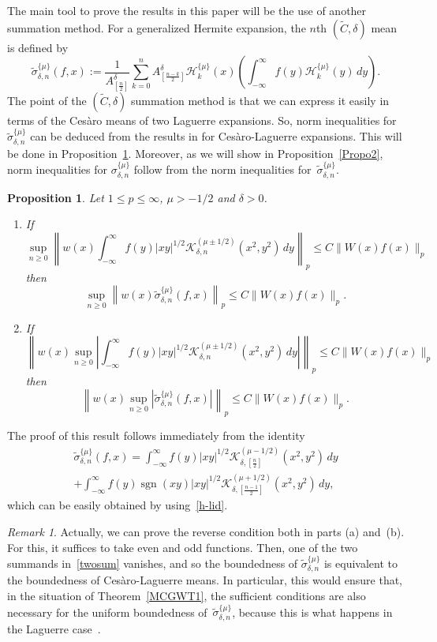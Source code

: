 \documentclass{amsart}
\theoremstyle{plain}
\newtheorem{Prop}{Proposition}
\theoremstyle{definition}
\theoremstyle{remark}
\newtheorem{Rem}{Remark}
\newcommand{\chem}[3]{\sigma_{#1,#2}^{\{#3\}}} %
\newcommand{\chemmod}[3]{\widetilde{\sigma}_{#1,#2}^{\{#3\}}} %
\newcommand{\claker}[5]{\mathcal{K}_{#1,#2}^{(#3)}%
  (#4,#5)} %
\newcommand{\herfun}[2]{\mathcal{H}_{#1}^{\{#2\}}}
\newcommand{\combi}[2]{A_{#1}^{#2}}
\newcommand{\I}{\infty}
\newcommand{\sgn}{\operatorname{sgn}}
\begin{document}
The main tool to prove the results in this paper will be the use of another summation method.
For a generalized Hermite expansion, the $n$th $(\widetilde{C},\delta)$ mean is defined by
\begin{equation}
\label{stilde}
  \chemmod{\delta}{n}{\mu}(f,x)
  := \frac{1}{\combi{[\frac{n}2]}{\delta}}
  \sum_{k=0}^n\combi{[\frac{n-k}2]}{\delta}
  \herfun{k}{\mu}(x) \left(\int_{-\I}^\I f(y)\herfun{k}{\mu}(y)\,dy\right).
\end{equation}
The point of the $(\widetilde{C},\delta)$ summation method is that we can express it easily
in terms of the Ces\`{a}ro means of two Laguerre expansions. So, norm inequalities for
$\chemmod{\delta}{n}{\mu}$ can be deduced from the results in \cite{MW} for
Ces\`{a}ro-Laguerre expansions. This will be done in Proposition~\ref{Propo1}. Moreover,
as we will show in Proposition~\ref{Propo2}, norm inequalities for $\chem{\delta}{n}{\mu}$
follow from the norm inequalities for~$\chemmod{\delta}{n}{\mu}$.

\begin{Prop}
\label{Propo1}
Let $1\le p \le \I$, $\mu >-1/2$ and $\delta>0$.
\begin{enumerate}
\item[a)] If
\[
  \sup_{n\ge 0} \left\|w(x)\int_{-\I}^{\I}f(y)|xy|^{1/2}
    \claker{\delta}{n}{\mu\pm 1/2}{x^2}{y^2}\,dy\right\|_{p}
  \le C \|W(x)f(x)\|_{p}
\]
then
\[
  \sup_{n\ge 0} \left\|w(x)\chemmod{\delta}{n}{\mu}(f,x)\right\|_p
  \le C \|W(x)f(x)\|_p.
\]
\item[b)] If
\[
  \left\|w(x)\sup_{n\ge 0} \left|\int_{-\I}^{\I}f(y)|xy|^{1/2}
    \claker{\delta}{n}{\mu\pm 1/2}{x^2}{y^2}\,dy\right|\right\|_{p}
  \le C \|W(x)f(x)\|_{p}
\]
then
\[
  \left\|w(x)\sup_{n\ge 0} \left|\chemmod{\delta}{n}{\mu}(f,x)\right|\right\|_p
  \le C \|W(x)f(x)\|_p.\]
\end{enumerate}
\end{Prop}
The proof of this result follows immediately from the identity
\begin{multline}
\label{twosum}
  \chemmod{\delta}{n}{\mu}(f,x)
  = \int_{-\I}^{\I}f(y)|xy|^{1/2}
    \claker{\delta}{[\frac{n}2]}{\mu-1/2}{x^2}{y^2}\,dy \\
  + \int_{-\I}^{\I}f(y)\sgn(xy)|xy|^{1/2}
    \claker{\delta}{[\frac{n-1}2]}{\mu+1/2}{x^2}{y^2}\,dy,
\end{multline}
which can be easily obtained by using~\eqref{h-lid}.

\begin{Rem}
\label{equiv}
Actually, we can prove the reverse condition both in parts (a) and~(b).
For this, it suffices to take even and odd functions.
Then, one of the two summands in~\eqref{twosum} vanishes,
and so the boundedness of $\chemmod{\delta}{n}{\mu}$ is equivalent
to the boundedness of Ces\`aro-Laguerre means.
In particular, this would ensure that, in the situation of Theorem~\ref{MCGWT1},
the sufficient conditions are also necessary for the uniform boundedness
of~$\chemmod{\delta}{n}{\mu}$,
because this is what happens in the Laguerre case~\cite{MW}.
\end{Rem}
\end{document}
